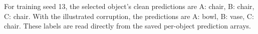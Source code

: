 For training seed 13, the selected object's clean predictions are A: chair, B: chair, C: chair. With the illustrated corruption, the predictions are A: bowl, B: vase, C: chair. These labels are read directly from the saved per-object prediction arrays.
